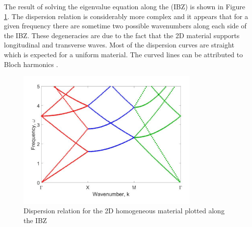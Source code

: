 \documentclass{article}
\begin{document}
The result of solving the eigenvalue equation along the (IBZ) is shown in 
Figure \ref{fig:twodunif}. The dispersion relation is considerably more complex 
and it appears that for a given frequency there are sometime two possible 
wavenumbers along each side of the IBZ. These degeneracies are due to the fact 
that the 2D material supports longitudinal and transverse waves. Most of the 
dispersion curves are straight which is expected for a uniform material. The 
curved lines can be attributed to Bloch harmonics \cite{veres13}.
\begin{figure}[!htbp]
	\centering
	\includegraphics[width=0.8\textwidth]{twodunif.pdf}
	\caption{Dispersion relation for the 2D homogeneous material plotted along 
	the IBZ}
	\label{fig:twodunif}
\end{figure}
\end{document}
